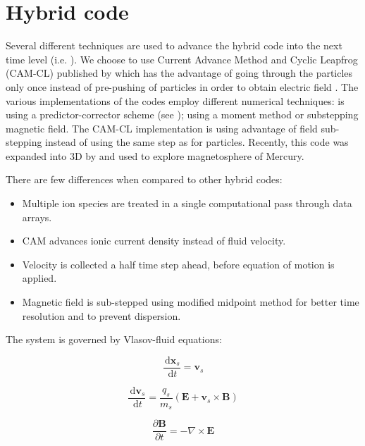 \documentclass[oneside,branding,toc,article]{sat}
\begin{document}
\section{Hybrid code}

Several different techniques are used to advance the hybrid code into the next
time level (i.e. \cite{winske85, wiom93, wiom96}).  We choose to use Current
Advance Method and Cyclic Leapfrog (CAM-CL) published by \cite{matthews94}
which has the advantage of going through the particles only once instead of
pre-pushing of particles in order to obtain electric field \citep{harned82}.
The various implementations of the codes employ different numerical techniques:
\cite{harned82} is using a predictor-corrector scheme (see \cite{nr92});
\cite{wiqu88} using a moment method or \cite{hoshan89} substepping magnetic
field.  The CAM-CL implementation is using advantage of field sub-stepping
instead of using the same step as for particles.  Recently, this code was
expanded into 3D by \cite{travea07} and used to explore magnetosphere of
Mercury.

There are few differences when compared to other hybrid codes:
\begin{itemize}
\item Multiple ion species are treated in a single computational pass through
  data arrays.
\item CAM advances ionic current density instead of fluid velocity.
\item Velocity is collected a half time step ahead, before equation of motion
  is applied.
\item Magnetic field is sub-stepped using modified midpoint method \citep{nr92}
  for better time resolution and to prevent dispersion.
\end{itemize}

The system is governed by Vlasov-fluid equations:

\begin{equation}
  \frac{\, {\mathrm d}{\mathbf{x}_s}}{\, {\mathrm d}{t}} = \mathbf{v}_s
\end{equation}

\begin{equation}
  \frac{\, {\mathrm d}{\mathbf{v}_s}}{\, {\mathrm d}{t}} =
  \frac{q_s}{m_s} ( \mathbf{E} + \mathbf{v}_s \times \mathbf{B} )
\end{equation}

\begin{equation}
  \frac{\partial \mathbf{B}}{\partial t} = - \nabla \times \mathbf{E}
  \label{eq:faraday}
\end{equation}
\end{document}
